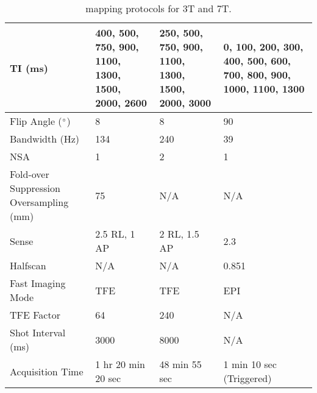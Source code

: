 \begin{table}[H]
\begin{tabularx}{1.0\textwidth}{X|X|X|X}
		TI (ms)                                   & 400, 500, 750, 900,   1100, 1300, 1500, 2000, 2600 & 250, 500, 750, 900,   1100, 1300, 1500, 2000, 3000 & 0, 100, 200, 300,   400, 500, 600, 700, 800, 900, 1000, 1100, 1300 \\ \hline
		Flip Angle ($\degree$)                    & 8                                                  & 8                                                  & 90                                                                 \\ \hline
		Bandwidth (Hz)                            & 134                                                & 240                                                & 39                                                                 \\ \hline
		NSA                                       & 1                                                  & 2                                                  & 1                                                                  \\ \hline
		Fold-over Suppression   Oversampling (mm) & 75                                                 & N/A                                                & N/A                                                                \\ \hline
		Sense                                     & 2.5 RL, 1 AP                                       & 2 RL, 1.5 AP                                        & 2.3                                                                \\ \hline
		Halfscan                                  & N/A                                                & N/A                                                & 0.851                                                              \\ \hline
		Fast Imaging Mode                         & TFE                                                & TFE                                                & EPI                                                                \\ \hline
		TFE Factor                                & 64                                                 & 240                                                & N/A                                                                \\ \hline
		Shot Interval (ms)                        & 3000                                               & 8000                                               & N/A                                                                \\ \hline
		Acquisition Time                          & 1 hr 20 min 20 sec                                 & 48 min 55 sec                                      & 1 min 10 sec (Triggered) 
	\end{tabularx}
	\caption{\tone mapping protocols for 3T and 7T.}
	\label{tab:ex_t1_mapping}
\end{table}

